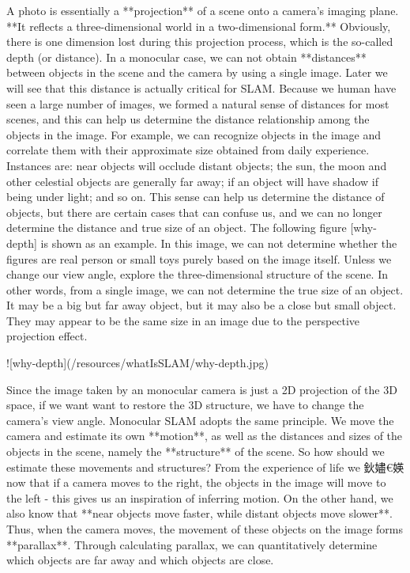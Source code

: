 A photo is essentially a **projection** of a scene onto a camera's imaging plane. **It reflects a three-dimensional world in a two-dimensional form.** Obviously, there is one dimension lost during this projection process, which is the so-called depth (or distance). In a monocular case, we can not obtain **distances** between objects in the scene and the camera by using a single image. Later we will see that this distance is actually critical for SLAM. Because we human have seen a large number of images, we formed a natural sense of distances for most scenes, and this can help us determine the distance relationship among the objects in the image. For example, we can recognize objects in the image and correlate them with their approximate size obtained from daily experience. Instances are: near objects will occlude distant objects; the sun, the moon and other celestial objects are generally far away; if an object will have shadow if being under light; and so on. This sense can help us determine the distance of objects, but there are certain cases that can confuse us, and we can no longer determine the distance and true size of an object. The following figure [why-depth] is shown as an example. In this image, we can not determine whether the figures are real person or small toys purely based on the image itself. Unless we change our view angle, explore the three-dimensional structure of the scene. In other words, from a single image, we can not determine the true size of an object. It may be a big but far away object, but it may also be a close but small object. They may appear to be the same size in an image due to the perspective projection effect.

![why-depth](/resources/whatIsSLAM/why-depth.jpg)

Since the image taken by an monocular camera is just a 2D projection of the 3D space, if we want want to restore the 3D structure, we have to change the camera's view angle. Monocular SLAM adopts the same principle. We move the camera and estimate its own **motion**, as well as the distances and sizes of the objects in the scene, namely the **structure** of the scene. So how should we estimate these movements and structures? From the experience of life we 鈥嬧€媖now that if a camera moves to the right, the objects in the image will move to the left - this gives us an inspiration of inferring motion. On the other hand, we also know that **near objects move faster, while distant objects move slower**. Thus, when the camera moves, the movement of these objects on the image forms **parallax**. Through calculating parallax, we can quantitatively determine which objects are far away and which objects are close.

